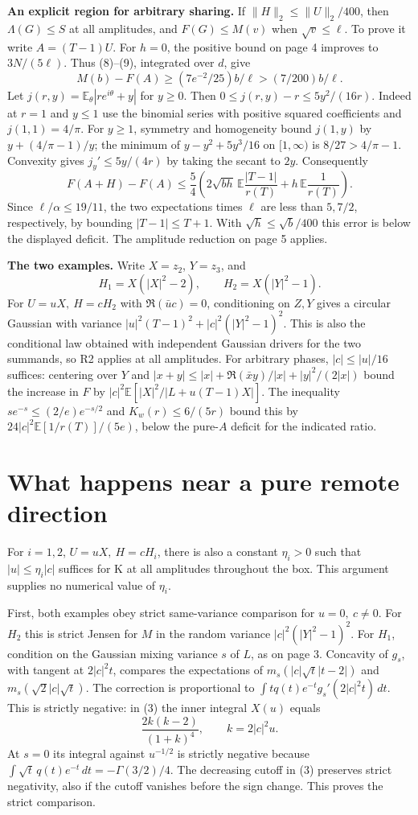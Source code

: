 \documentclass[11pt]{article}
\newcommand{\E}{\mathbb E}
\newcommand{\dd}{\,d}
\newcommand{\head}[1]{\section*{#1}}
\begin{document}
\textbf{An explicit region for arbitrary sharing.} If \(\|H\|_2\le\|U\|_2/400\),
then \(\Lambda(G)\le S\) at all amplitudes, and \(F(G)\le M(v)\) when
\(\sqrt v\le\ell\). To prove it write \(A=(T-1)U\).
For \(h=0\), the positive bound on page 4 improves to \(3N/(5\ell)\).
Thus (8)--(9), integrated over \(d\), give
\[
         M(b)-F(A)\ge (7e^{-2}/25)b/\ell>(7/200)b/\ell.
\]
Let \(j(r,y)=\E_\theta|re^{i\theta}+y|\) for \(y\ge0\).
Then \(0\le j(r,y)-r\le5y^2/(16r)\). Indeed at \(r=1\) and \(y\le1\) use the
binomial series with positive squared coefficients and \(j(1,1)=4/\pi\).
For \(y\ge1\), symmetry and homogeneity bound \(j(1,y)\) by \(y+(4/\pi-1)/y\);
the minimum of \(y-y^2+5y^3/16\) on \([1,\infty)\) is \(8/27>4/\pi-1\).
Convexity gives \(j_y'\le5y/(4r)\) by taking the secant to \(2y\). Consequently
\[
 F(A+H)-F(A)\le\frac54\left(2\sqrt{bh}\,\E\frac{|T-1|}{r(T)}
                                   +h\,\E\frac1{r(T)}\right).
\]
Since \(\ell/\alpha\le19/11\), the two expectations times \(\ell\) are
less than \(5,7/2\), respectively, by bounding \(|T-1|\le T+1\).
With \(\sqrt h\le\sqrt b/400\) this error is below the displayed deficit.
The amplitude reduction on page 5 applies.

\textbf{The two examples.} Write \(X=z_2\), \(Y=z_3\), and
\[
 H_1=X(|X|^2-2),\qquad H_2=X(|Y|^2-1).
\]
For \(U=uX,\ H=cH_2\) with \(\Re(\bar u c)=0\), conditioning on \(Z,Y\) gives
a circular Gaussian with variance \(|u|^2(T-1)^2+|c|^2(|Y|^2-1)^2\).
This is also the conditional law obtained with independent Gaussian drivers
for the two summands, so R2 applies at all amplitudes.
For arbitrary phases, \(|c|\le|u|/16\) suffices: centering over \(Y\) and
\(|x+y|\le |x|+\Re(\bar x y)/|x|+|y|^2/(2|x|)\) bound the increase in \(F\)
by \(|c|^2\E[|X|^2/|L+u(T-1)X|]\). The inequality
\(s e^{-s}\le(2/e)e^{-s/2}\) and \(K_w(r)\le6/(5r)\) bound this by
\(24|c|^2\E[1/r(T)]/(5e)\), below the pure-\(A\) deficit for the indicated ratio.

\newpage
\head{What happens near a pure remote direction}
For \(i=1,2\), \(U=uX,\ H=cH_i\), there is also a constant \(\eta_i>0\)
such that \(|u|\le\eta_i |c|\) suffices for K at all amplitudes throughout
the box. This argument supplies no numerical value of \(\eta_i\).

First, both examples obey strict same-variance comparison for \(u=0,\ c\ne0\).
For \(H_2\) this is strict Jensen for \(M\) in the random variance
\(|c|^2(|Y|^2-1)^2\).
For \(H_1\), condition on the Gaussian mixing variance \(s\) of \(L\), as on
page 3. Concavity of \(g_s\), with tangent at \(2|c|^2t\), compares the expectations
of \(m_s(|c|\sqrt t|t-2|)\) and \(m_s(\sqrt2|c|\sqrt t)\).
The correction is proportional to
\(\int t q(t)e^{-t} g_s'(2|c|^2t)\dd t\). This is strictly negative:
in (3) the inner integral \(X(u)\) equals
\[
        \frac{2k(k-2)}{(1+k)^4},\qquad k=2|c|^2u.
\]
At \(s=0\) its integral against \(u^{-1/2}\) is strictly negative because
\(\int \sqrt t\,q(t)e^{-t}\dd t=-\Gamma(3/2)/4\).
The decreasing cutoff in (3) preserves strict negativity, also if the cutoff
vanishes before the sign change. This proves the strict comparison.
\end{document}

